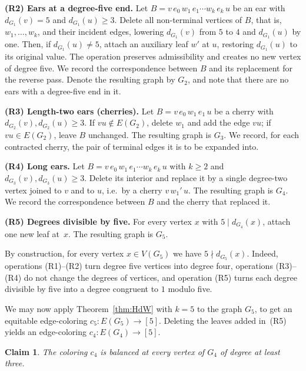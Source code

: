 \documentclass[11pt]{article}
\newtheorem{claim}[theorem]{Claim}
\theoremstyle{definition}
\begin{document}
\medskip
\noindent\textbf{(R2) Ears at a degree-five end.}
Let $B=v\,e_0\,w_1\,e_1\cdots w_k\,e_k\,u$ be an ear with $d_{G_1}(v)=5$ and $d_{G_1}(u)\ge 3$. Delete all non-terminal vertices of $B$, that is, $w_1,\dots,w_k$, and their incident edges, lowering $d_{G_1}(v)$ from $5$ to $4$ and $d_{G_1}(u)$ by one. Then, if $d_{G_1}(u)\neq 5$, attach an auxiliary leaf $w'$ at $u$, restoring $d_{G_1}(u)$ to its original value. The operation preserves admissibility and creates no new vertex of degree five. We record the correspondence between $B$ and its replacement for the reverse pass. Denote the resulting graph by $G_2$, and note that there are no ears with a degree-five end in it.

\medskip
\noindent\textbf{(R3) Length-two ears (cherries).}
Let $B=v\,e_0\,w_1\,e_1\,u$ be a cherry with $d_{G_2}(v),d_{G_2}(u)\ge 3$. If $vu\notin E(G_2)$, delete $w_1$ and add the edge $vu$; if $vu\in E(G_2)$, leave $B$ unchanged. The resulting graph is $G_3$. We record, for each contracted cherry, the pair of terminal edges it is to be expanded into.

\medskip
\noindent\textbf{(R4) Long ears.}
Let $B=v\,e_0\,w_1\,e_1\cdots w_k\,e_k\,u$ with $k\ge 2$ and $d_{G_3}(v),d_{G_3}(u)\ge 3$. Delete its interior and replace it by a single degree-two vertex joined to $v$ and to $u$, i.e.\ by a cherry $v\,w_1'\,u$. The resulting graph is $G_4$. We record the correspondence between $B$ and the cherry that replaced it.

\medskip
\noindent\textbf{(R5) Degrees divisible by five.}
For every vertex $x$ with $5\mid d_{G_4}(x)$, attach one new leaf at~$x$. The resulting graph is $G_5$.

\medskip
By construction, for every vertex $x\in V(G_5)$ we have $5\nmid d_{G_5}(x)$. Indeed, operations 
(R1)--(R2) turn degree five vertices into degree four, operations (R3)--(R4) do not change the degrees of vertices, and operation (R5) turns each degree divisible by five into a degree congruent to $1$ modulo five.

We may now apply Theorem~\ref{thm:HdW} with $k=5$ to the graph $G_5$, to get an equitable edge-coloring $c_5\colon E(G_5)\to[5]$. 
Deleting the leaves added in~(R5) yields an edge-coloring $c_4\colon E(G_4)\to[5]$.

\begin{claim}\label{claim:balanced-G4}
The coloring $c_4$ is balanced at every vertex of $G_4$ of degree at least three.
\end{claim}
\end{document}
